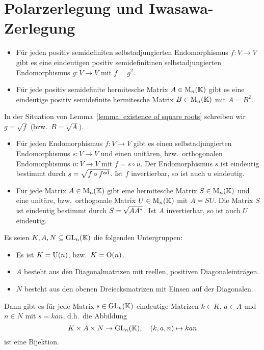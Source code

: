 \section{Polarzerlegung und Iwasawa-Zerlegung}

\begin{lemma}
  \label{lemma: existence of square roots}
  \begin{itemize}
    \item
      Für jeden positiv semidefiniten selbstadjungierten Endomorphismus $f \colon V \to V$ gibt es eine eindeutigen positiv semidefinitinen selbstadjungierten Endomorphismus $g \colon V \to V$ mit $f = g^2$.
    \item
      Für jede positiv semidefinite hermitesche Matrix $A \in \operatorname{M}_{n}(\mathbb{K})$ gibt es eine eindeutige positiv semidefinite hermitesche Matrix $B \in \operatorname{M}_{n}(\mathbb{K})$ mit $A = B^2$.
  \end{itemize}
\end{lemma}

In der Situation von Lemma~\ref{lemma: existence of square roots} schreiben wir $g = \sqrt{f}$ (bzw.\ $B = \sqrt{A}$).

\begin{theorem}[Polarzerlegung]
  \begin{itemize}
    \item
      Für jeden Endomorphismus $f \colon V \to V$ gibt es einen selbstadjungierten Endomorphismus $s \colon V \to V$ und einen unitären, bzw.\ orthogonalen Endomorphismus $u \colon V \to V$ mit $f = s \circ u$.
      Der Endomorphismus $s$ ist eindeutig bestimmt durch $s = \sqrt{f \circ f^{\operatorname{ad}}}$.
      Ist $f$ invertierbar, so ist auch $u$ eindeutig.
    
    \item
      Für jede Matrix $A \in \operatorname{M}_{n}(\mathbb{K})$ gibt eine hermitesche Matrix $S \in \operatorname{M}_{n}(\mathbb{K})$ und eine unitäre, bzw.\ orthogonale Matrix $U \in \operatorname{M}_{n}(\mathbb{K})$ mit $A = SU$.
      Die Matrix $S$ ist eindeutig bestimmt durch $S = \sqrt{A A^*}$.
      Ist $A$ invertierbar, so ist auch $U$ eindeutig.
  \end{itemize}
\end{theorem}

\begin{theorem}
  Es seien $K, A, N \subseteq \operatorname{GL}_{n}(\mathbb{K})$ die folgenden Untergruppen:
  \begin{itemize}
    \item
      Es ist $K = \operatorname{U}(n)$, bzw.\ $K = \operatorname{O}(n)$.
    \item
      $A$ besteht aus den Diagonalmatrizen mit reellen, positiven Diagonaleinträgen.
    \item
      $N$ besteht aus den obenen Dreiecksmatrizen mit Einsen auf der Diagonalen.
  \end{itemize}
  Dann gibt es für jede Matrix $s \in \operatorname{GL}_{n}(\mathbb{K})$ eindeutige Matrizen $k \in K$, $a \in A$ und $n \in N$ mit $s = kan$, d.h.\ die Abbildung
  \[
            K \times A \times N
    \to     \operatorname{GL}_{n}(\mathbb{K}),
    \quad   (k, a, n)
    \mapsto kan
  \]
  ist eine Bijektion.
\end{theorem}

